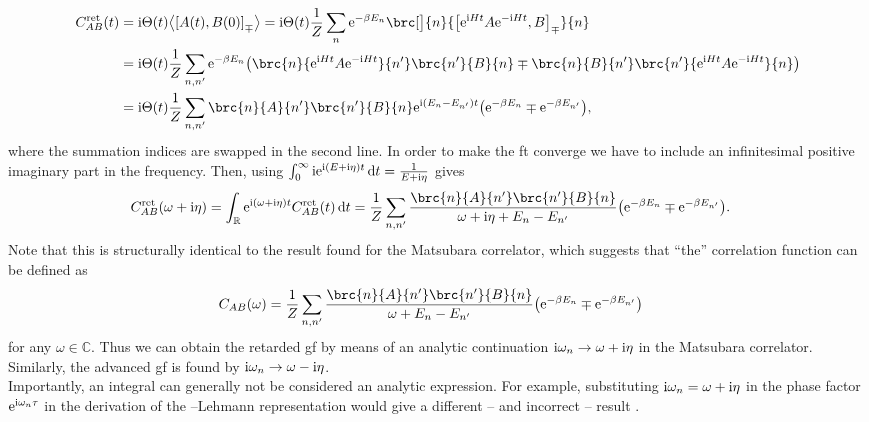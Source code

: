 \begin{align*}
C^\ret_{AB}(t) &= \i\Theta(t) \bra*{\klb*{A(t), B(0)}_\mp} = \i\Theta(t) \frac{1}{Z} \sum_{n} \powe{-\beta E_n} \brc[\big]{n}{\klb*{\powe{\i Ht} A \powe{-\i Ht}, B}_\mp }{n}\\
&= \i\Theta(t) \frac{1}{Z} \sum_{n,n'} \powe{-\beta E_n} \kla*{\brc{n}{\powe{\i Ht} A \powe{-\i Ht} }{n'} \brc{n'}{B}{n} \mp \brc{n}{B}{n'}\brc{n'}{\powe{\i Ht} A \powe{-\i Ht}}{n}}\\
&= \i\Theta(t) \frac{1}{Z} \sum_{n,n'} \brc{n}{A}{n'} \brc{n'}{B}{n} \powe{\i (E_n - E_{n'}) t} \kla*{\powe{-\beta E_n} \mp \powe{-\beta E_{n'}}},
\end{align*}
where the summation indices are swapped in the second line.
In order to make the \gls{ft} converge we have to include an infinitesimal positive imaginary part in the frequency.
Then, using $\int_{0}^{\infty} \text{i} \text{e}^{\text{i} (E + \text{i}\eta) t}  \,\mathrm{d}t = \frac{1}{E + \text{i} \eta}$ gives
\begin{align*}
C^\ret_{AB}(\omega + \i \eta) &= \intr{\powe{\i(\omega + \i \eta) t} C^\ret_{AB}(t)}{t} = \frac{1}{Z} \sum_{n,n'} \frac{\brc{n}{A}{n'} \brc{n'}{B}{n} }{\omega + \i\eta + E_n - E_{n'}} \kla*{\powe{-\beta E_n} \mp \powe{-\beta E_{n'}}}.
\end{align*}
Note that this is structurally identical to the result found for the Matsubara correlator, which suggests that ``the'' correlation function can be defined as \cite[]{QMB_Bruus_2004}
\begin{align*}
C_{AB}(\omega) &= \frac{1}{Z} \sum_{n,n'} \frac{\brc{n}{A}{n'} \brc{n'}{B}{n} }{\omega + E_n - E_{n'}} \kla*{\powe{-\beta E_n} \mp \powe{-\beta E_{n'}}}
\end{align*}
for any $\omega\in\mathbb{C}$.
Thus we can obtain the retarded \gls{gf} by means of an analytic continuation $\text{i}\omega_n \rightarrow \omega + \text{i}\eta$ in the Matsubara correlator. %
Similarly, the advanced \gls{gf} is found by $\text{i}\omega_n \rightarrow \omega - \text{i}\eta$.\\
Importantly, an integral can generally not be considered an analytic expression.
For example, substituting $\text{i}\omega_n = \omega + \text{i}\eta$ in the phase factor $\text{e}^{\text{i}\omega_n \tau}$ in the derivation of the \nameKallen--Lehmann representation would give a different -- and incorrect -- result \cite[]{QMB_Bruus_2004}.
